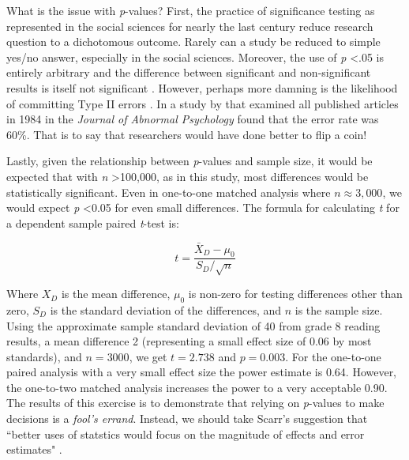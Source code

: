 \documentclass[letterpaper,12p,twoside]{article} %
\begin{document}
What is the issue with \textit{p}-values? First, the practice of significance testing as represented in the social sciences for nearly the last century reduce research question to a dichotomous outcome. Rarely can a study be reduced to simple yes/no answer, especially in the social sciences. Moreover, the use of \textit{p} \textless .05 is entirely arbitrary and the difference between significant and non-significant results is itself not significant \cite{GelmanStern2006}. However, perhaps more damning is the likelihood of committing Type II errors \cite{Bakan1966,Carver1978,Cohen1994,HenkelMorrison1970,Rozeboom1960,Schmidt1996}. In a study by  that examined all published articles in 1984 in the \textit{Journal of Abnormal Psychology} found that the error rate was 60\%. That is to say that researchers would have done better to flip a coin!

Lastly, given the relationship between \textit{p}-values and sample size, it would be expected that with \textit{n} \textgreater 100,000, as in this study, most differences would be statistically significant. Even in one-to-one matched analysis where $n \approx 3,000$, we would expect \textit{p} \textless 0.05 for even small differences. The formula for calculating \textit{t} for a dependent sample paired \textit{t}-test is:

$$ t = \frac{{\bar{X}_D} - \mu_0}{S_D / \sqrt{n}} $$

\noindent Where $X_D$ is the mean difference, $\mu_0$ is non-zero for testing differences other than zero, $S_D$ is the standard deviation of the differences, and $n$ is the sample size. Using the approximate sample standard deviation of 40 from grade 8 reading results, a mean difference 2 (representing a small effect size of 0.06 by most standards), and $n = 3000$, we get $t = 2.738$ and $p = 0.003$. For the one-to-one paired analysis with a very small effect size the power estimate  is 0.64. However, the one-to-two matched analysis increases the power to a very acceptable 0.90. The results of this exercise is to demonstrate that relying on \textit{p}-values to make decisions is a \textit{fool's errand}. Instead, we should take Scarr's suggestion that ``better uses of statstics would focus on the magnitude of effects and error estimates" \cite{Scarr1997}.
\end{document}
